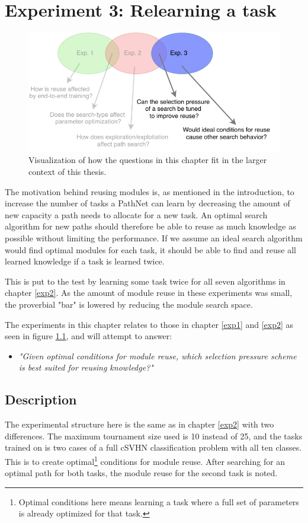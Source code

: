 \chapter{Experiment 3: Relearning a task}
\label{exp3}

\begin{figure}[hb]
    \includegraphics[width=\textwidth]{Chapters/4.Experiments/exp3/figures/exp3.pdf}
    \caption[Experiment focus]{Visualization of how the questions in this chapter fit in the larger context of this thesis.}
    \label{fig:exp3.questions}
\end{figure}
\noindent
The motivation behind reusing modules is, as mentioned in the introduction, to increase the number of tasks a PathNet can learn by decreasing the amount of new capacity a path needs to allocate for a new task. An optimal search algorithm for new paths should therefore be able to reuse as much knowledge as possible without limiting the performance. If we assume an ideal search algorithm would find optimal modules for each task, it should be able to find and reuse all learned knowledge if a task is learned twice. 

This is put to the test by learning some task twice for all seven algorithms in chapter \ref{exp2}. As the amount of module reuse in these experiments was small, the proverbial "bar" is lowered by reducing the module search space.

The experiments in this chapter relates to those in chapter \ref{exp1} and \ref{exp2} as seen in figure \ref{fig:exp3.questions}, and will attempt to answer:
\begin{itemize}
    \item \emph{"Given optimal conditions for module reuse, which selection pressure scheme is best suited for reusing knowledge?"}
\end{itemize}


\section{Description}
The experimental structure here is the same as in chapter \ref{exp2} with two differences. The maximum tournament size used is 10 instead of 25, and the tasks trained on is two cases of a full cSVHN classification problem with all ten classes. This is to create optimal\footnote{Optimal conditions here means learning a task where a full set of parameters is already optimized for that task.} conditions for module reuse. After searching for an optimal path for both tasks, the module reuse for the second task is noted. 

